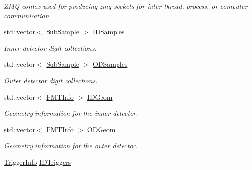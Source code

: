 \begin{DoxyCompactItemize}
\begin{DoxyCompactList}\small\item\em Z\-M\-Q contex used for producing zmq sockets for inter thread, process, or computer communication. \end{DoxyCompactList}\item 
\hypertarget{classDataModel_a117f5512507948489a7e726391c04324}{std\-::vector$<$ \hyperlink{classSubSample}{Sub\-Sample} $>$ \hyperlink{classDataModel_a117f5512507948489a7e726391c04324}{I\-D\-Samples}}\label{classDataModel_a117f5512507948489a7e726391c04324}

\begin{DoxyCompactList}\small\item\em Inner detector digit collections. \end{DoxyCompactList}\item 
\hypertarget{classDataModel_ac5669b4fb4e31fcb9525981ace801017}{std\-::vector$<$ \hyperlink{classSubSample}{Sub\-Sample} $>$ \hyperlink{classDataModel_ac5669b4fb4e31fcb9525981ace801017}{O\-D\-Samples}}\label{classDataModel_ac5669b4fb4e31fcb9525981ace801017}

\begin{DoxyCompactList}\small\item\em Outer detector digit collections. \end{DoxyCompactList}\item 
\hypertarget{classDataModel_a8b6ab332fa38b2ebfb686cb47e37a027}{std\-::vector$<$ \hyperlink{classPMTInfo}{P\-M\-T\-Info} $>$ \hyperlink{classDataModel_a8b6ab332fa38b2ebfb686cb47e37a027}{I\-D\-Geom}}\label{classDataModel_a8b6ab332fa38b2ebfb686cb47e37a027}

\begin{DoxyCompactList}\small\item\em Geometry information for the inner detector. \end{DoxyCompactList}\item 
\hypertarget{classDataModel_a71675824a1aef386894d876545f52094}{std\-::vector$<$ \hyperlink{classPMTInfo}{P\-M\-T\-Info} $>$ \hyperlink{classDataModel_a71675824a1aef386894d876545f52094}{O\-D\-Geom}}\label{classDataModel_a71675824a1aef386894d876545f52094}

\begin{DoxyCompactList}\small\item\em Geometry information for the outer detector. \end{DoxyCompactList}\item 
\hypertarget{classDataModel_a1ec2850822f07de49f6ddb05a8537881}{\hyperlink{classTriggerInfo}{Trigger\-Info} \hyperlink{classDataModel_a1ec2850822f07de49f6ddb05a8537881}{I\-D\-Triggers}}\label{classDataModel_a1ec2850822f07de49f6ddb05a8537881}


\end{DoxyCompactItemize}
